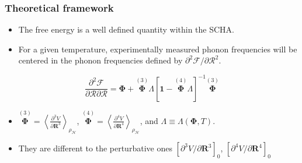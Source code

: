 \documentclass{beamer}
\begin{document}
\begin{frame}

\frametitle{Theoretical framework}
\begin{itemize}
 \item The free energy is a well defined quantity within the SCHA.
 \item For a given temperature, experimentally measured phonon frequencies will be centered in the phonon frequencies defined by $\partial^{2}\mathcal{F}/\partial\boldsymbol{\mathcal{R}}^{2}$.
\end{itemize}
\begin{equation}
\nonumber
 \frac{\partial^{2}\mathcal{F}}{\partial\boldsymbol{\mathcal{R}}\partial\boldsymbol{\mathcal{R}}}=\boldsymbol{\Phi}+\overset{(3)}{\boldsymbol{\Phi}}\Lambda[\boldsymbol{1}-\overset{(4)}{\boldsymbol{
 \Phi}}\Lambda]^{-1}\overset{(3)}{\boldsymbol{\Phi}}
\end{equation}
\begin{itemize}
 \item $\overset{(3)}{\boldsymbol{\Phi}}=\left\langle\frac{\partial^{3}V}{\partial\boldsymbol{R}^{3}}\right\rangle_{\rho_{\mathcal{H}}}$, \hspace{0.2cm}
       $\overset{(4)}{\boldsymbol{\Phi}}=\left\langle\frac{\partial^{4}V}{\partial\boldsymbol{R}^{4}}\right\rangle_{\rho_{\mathcal{H}}}$, and
       $\Lambda\equiv\Lambda(\boldsymbol{\Phi},T)$.
\item They are different to the perturbative ones $[\partial^{3}V/\partial\boldsymbol{R}^{3}]_{0}$, $[\partial^{4}V/\partial\boldsymbol{R}^{4}]_{0}$
\end{itemize}

\end{frame}

\end{document}
